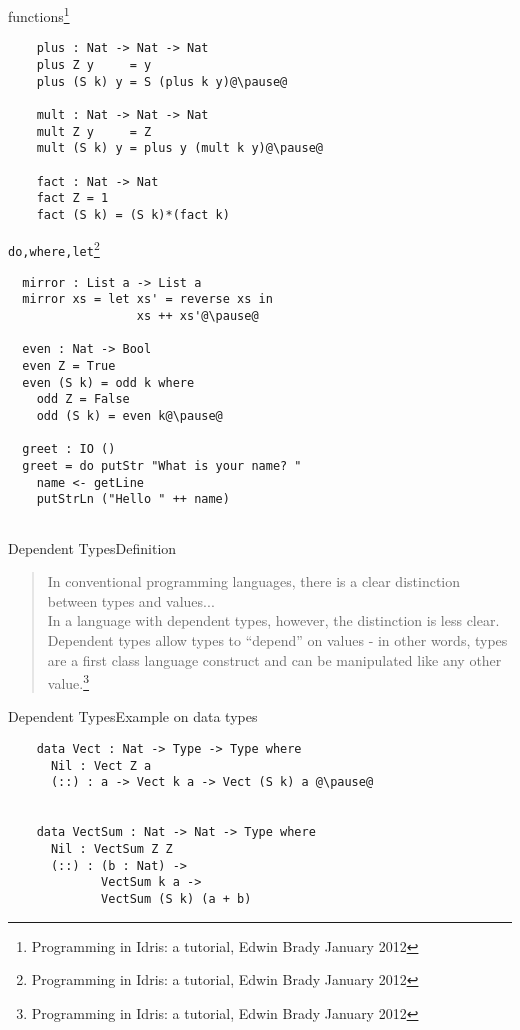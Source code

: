 \documentclass[rail]{beamer}
\begin{document}
\begin{frame}[fragile]{\idris}
  {functions\footnote[frame,1]
    {Programming in Idris: a tutorial, Edwin Brady January 2012}}
  \begin{lstlisting}
    plus : Nat -> Nat -> Nat
    plus Z y     = y
    plus (S k) y = S (plus k y)@\pause@

    mult : Nat -> Nat -> Nat
    mult Z y     = Z
    mult (S k) y = plus y (mult k y)@\pause@

    fact : Nat -> Nat
    fact Z = 1
    fact (S k) = (S k)*(fact k)
  \end{lstlisting}
\end{frame}

\begin{frame}[fragile]{\idris}
  {\texttt{do,where,let}\footnote[frame,1]
    {Programming in Idris: a tutorial, Edwin Brady January 2012}}
\begin{lstlisting}
  mirror : List a -> List a
  mirror xs = let xs' = reverse xs in
                  xs ++ xs'@\pause@

  even : Nat -> Bool
  even Z = True
  even (S k) = odd k where
    odd Z = False
    odd (S k) = even k@\pause@

  greet : IO ()
  greet = do putStr "What is your name? "
    name <- getLine
    putStrLn ("Hello " ++ name)


\end{lstlisting}
\end{frame}

\begin{frame}{Dependent Types}{Definition}
  \begin{quotation}
    In conventional programming languages, there is a clear
    distinction between types and values... \\
    In a language with dependent types, however, the distinction is
    less clear. Dependent types allow types to ``depend'' on values -
    in other words, types are a first class language construct and can
    be manipulated like any other value.\footnote[frame,1]
    {Programming in Idris: a tutorial, Edwin Brady January 2012}
  \end{quotation}
\end{frame}

\begin{frame}[fragile]{Dependent Types}{Example on data types}
  \begin{lstlisting}
    data Vect : Nat -> Type -> Type where
      Nil : Vect Z a
      (::) : a -> Vect k a -> Vect (S k) a @\pause@


    data VectSum : Nat -> Nat -> Type where
      Nil : VectSum Z Z
      (::) : (b : Nat) ->
             VectSum k a ->
             VectSum (S k) (a + b)
    \end{lstlisting}
\end{frame}
\end{document}
